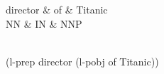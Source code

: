 \documentclass{article}
\begin{document}
\thispagestyle{empty}
\begin{center}
 \begin{dependency}[theme = default]
   \begin{deptext}[column sep=1em]
   director \& of \& Titanic \\
   NN \& IN \& NNP \\
   \end{deptext}
\end{dependency} \\
(l-prep director (l-pobj of Titanic))
\end{center}
\end{document}
